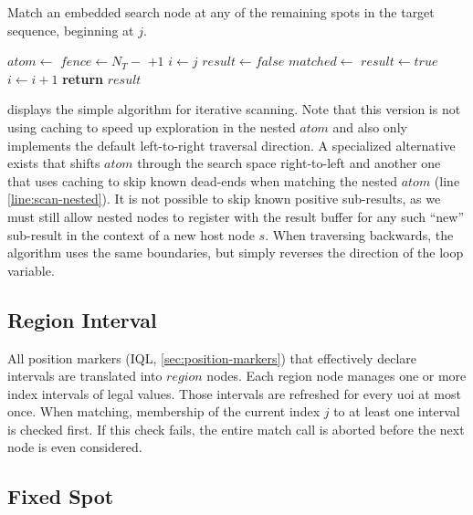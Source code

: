\documentclass[11pt,a4paper]{report}
\begin{document}
\begin{algorithm}[H]
	\caption[Iterative scan matching]{Match an embedded search node at any of the remaining spots in the target sequence, beginning at $j$.}
	\label{alg:match-scan}
	\begin{algorithmic}[1]
		\State $atom \gets$ 
		\State $fence \gets N_T -$  $ + 1$
		\State $i \gets j$
		\State $result \gets false$
		 
			\State $matched \gets$ \label{line:scan-nested}
				\State $result \gets true$
			\EndIf
			\State $i \gets i +1$
		\EndWhile
		\State \textbf{return} $result$
		\EndProcedure
	\end{algorithmic}
\end{algorithm}

 displays the simple algorithm for iterative scanning.
Note that this version is not using caching to speed up exploration in the nested $atom$ and also only implements the default left-to-right traversal direction.
A specialized alternative exists that shifts $atom$ through the search space right-to-left and another one that uses caching to skip known dead-ends when matching the nested $atom$ (line \ref{line:scan-nested}).
It is not possible to skip known positive sub-results, as we must still allow nested nodes to register with the result buffer for any such ``new'' sub-result in the context of a new host node $s$.
When traversing backwards, the algorithm uses the same boundaries, but simply reverses the direction of the loop variable.

\subsection{Region Interval}
\label{sec:seq-region}

All position markers (IQL, \cref{sec:position-markers}) that effectively declare intervals are translated into $region$ nodes.
Each region node manages one or more index intervals of legal values.
Those intervals are refreshed for every \ac{uoi} at most once.
When matching, membership of the current index $j$ to at least one interval is checked first.
If this check fails, the entire match call is aborted before the next node is even considered.

\subsection{Fixed Spot}
\label{sec:seq-spot}
\end{document}
